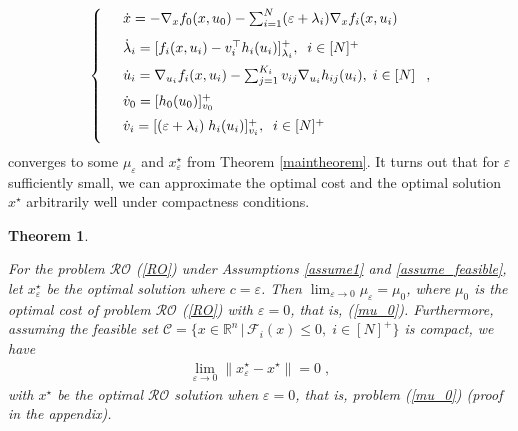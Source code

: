 \documentclass[journal,twoside,web]{ieeecolor}
\newtheorem{theorem}{Theorem}
\begin{document}
\begin{align} \label{pd_dynamics_ep}
\left\{
\begin{array}{cl}
\vspace{3mm}
&\dot x=-\nabla_x f_0(x,u_0)- \sum_{i=1}^N(\varepsilon+\lambda_i) \nabla_x f_i(x,u_i)\\
\vspace{2mm}
&\dot \lambda_i=[f_i(x,u_i)-v_i^\top h_i(u_i)]_{\lambda_i}^+,\;\; i\in[N]^+\\
\vspace{2mm}
&\dot u_i=\nabla_{u_i}f_i(x,u_i)-  \sum_{j=1}^{K_i} v_{ij} \nabla_{u_i} h_{ij}(u_i),\; i\in[N]\\
\vspace{2mm}
&\dot{v}_0=[h_0(u_0)]_{v_0}^+\\
\vspace{2mm}
&\dot v_i=[(\varepsilon+\lambda_i) \; h_i(u_i)]_{v_i}^+,\;\;i\in[N]^+
\end{array}\right.,
\end{align}
converges to some $\mu_{\varepsilon}$ and $x^\star_{\varepsilon}$ from Theorem \ref{maintheorem}. It turns out that for $\varepsilon$ sufficiently small, we can approximate the optimal cost and the optimal solution $x^\star$ arbitrarily well under compactness conditions.

\begin{theorem} \label{RO_ROperturbed}

For the problem $\mathcal{RO}$ (\ref{RO}) under Assumptions \ref{assume1} and \ref{assume_feasible}, let $x^\star_\varepsilon$ be the optimal solution where $c=\varepsilon$. Then
$\displaystyle\lim_{\varepsilon \to 0}\mu_\varepsilon=\mu_0$, where $\mu_0$ is the optimal cost of problem $\mathcal{RO}$ (\ref{RO}) with $\varepsilon=0$, that is, (\ref{mu_0}). Furthermore, assuming the feasible set $\mathcal{C}=\{x\in \mathbb{R}^n\,|\,\mathcal{F}_i(x)\leq 0,\; i\in[N]^+\}$ is compact, we have
\begin{align*}
\displaystyle\lim_{\varepsilon \to 0} \parallel x_\varepsilon^\star-x^\star \parallel=0\;,
\end{align*}
with $x^\star$ be the optimal $\mathcal{RO}$ solution when $\varepsilon=0$, that is, problem (\ref{mu_0}) (proof in the appendix).
\end{theorem}
\end{document}
